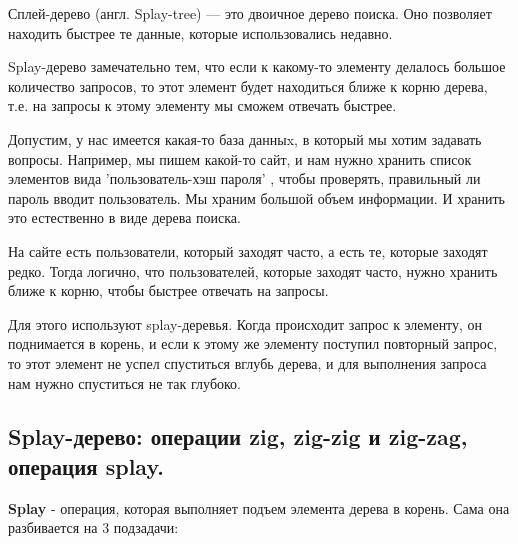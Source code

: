 \Def Сплей-дерево (англ. Splay-tree) — это двоичное дерево поиска. Оно позволяет находить быстрее те данные, которые использовались недавно.

Splay-дерево замечательно тем, что если к какому-то элементу делалось большое количество запросов, то этот элемент будет находиться ближе к корню дерева, т.е. на запросы к этому элементу мы сможем отвечать быстрее.

Допустим, у нас имеется какая-то база данныx, в который мы хотим задавать вопросы. Например, мы пишем какой-то сайт, и нам нужно хранить список элементов вида 'пользователь-хэш пароля' , чтобы проверять, правильный ли пароль вводит пользователь. Мы храним большой объем информации. И хранить это естественно в виде дерева поиска.

На сайте есть пользователи, который заходят часто, а есть те, которые заходят редко. Тогда логично, что пользователей, которые заходят часто, нужно хранить ближе к корню, чтобы быстрее отвечать на запросы. 

Для этого используют splay-деревья. Когда происходит запрос к элементу, он поднимается в корень, и если к этому же элементу поступил повторный запрос, то этот элемент не успел спуститься вглубь дерева, и для выполнения запроса нам нужно спуститься не так глубоко.

\subsection{Splay-дерево: операции zig, zig-zig и zig-zag, операция splay.}

\textbf{Splay} - операция, которая выполняет подъем элемента дерева в корень. Сама она разбивается на 3 подзадачи:

